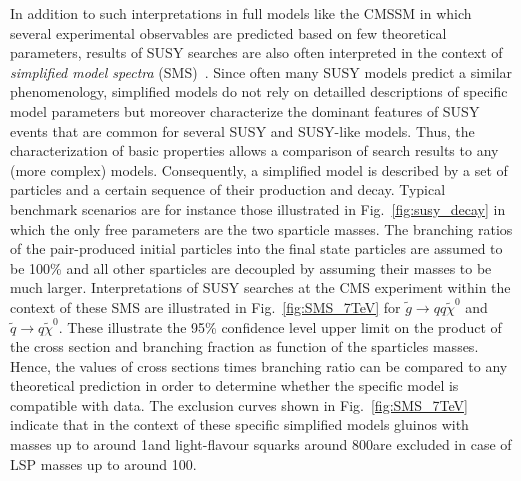 In addition to such interpretations in full models like the CMSSM in which several experimental observables are predicted based on few theoretical parameters, results of SUSY searches are also often interpreted in the context of \textit{simplified model spectra} (SMS)~\cite{ArkaniHamed:2007fw, Alwall:2008ag, Alwall:2008va, Chatrchyan:2013sza}. Since often many SUSY models predict a similar phenomenology, simplified models do not rely on detailled descriptions of specific model parameters but moreover characterize the dominant features of SUSY events that are common for several SUSY and SUSY-like models. Thus, the characterization of basic properties allows a comparison of search results to any (more complex) models. Consequently, a simplified model is described by a set of particles and a certain sequence of their production and decay. Typical benchmark scenarios are for instance those illustrated in Fig.~\ref{fig:susy_decay} in which the only free parameters are the two sparticle masses. The branching ratios of the pair-produced initial particles into the final state particles are assumed to be 100\% and all other sparticles are decoupled by assuming their masses to be much larger. Interpretations of SUSY searches at the CMS experiment within the context of these SMS are illustrated in Fig.~\ref{fig:SMS_7TeV} for $\tilde{g} \rightarrow qq\tilde{\chi}^0$ and $\tilde{q} \rightarrow q \tilde{\chi}^0$. These illustrate the 95\% confidence level upper limit on the product of the cross section and branching fraction as function of the sparticles masses. Hence, the values of cross sections times branching ratio can be compared to any theoretical prediction in order to determine whether the specific model is compatible with data. The exclusion curves shown in Fig.~\ref{fig:SMS_7TeV} indicate that in the context of these specific simplified models gluinos with masses up to around 1\tev and light-flavour squarks around 800\gev are excluded in case of LSP masses up to around 100\gev. \\
